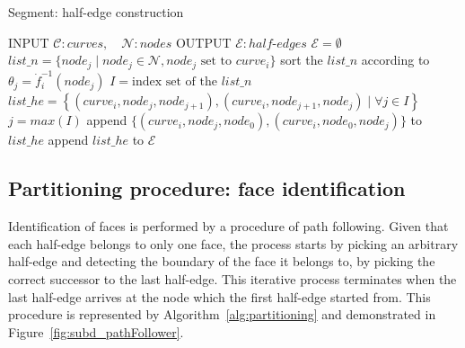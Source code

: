 \begin{algorithm}
  \caption {Segment: half-edge construction}
  \label{alg:halfedgeConstruction}
  \begin{algorithmic}
    \STATE INPUT  $\mathcal{C}:curves, \quad \mathcal{N}:nodes$
    \STATE OUTPUT  $\mathcal{E}:half\text{-}edges$
    \STATE \quad
    \STATE $\mathcal{E} = \emptyset$
    \STATE $list\_n = \{node_j \mid node_j \in \mathcal{N}, node_j \text{ set to } curve_i \}$
    \STATE sort the $list\_n$ according to $\theta_j=\dot{f}_{i}^{-1}(node_j)$
    \STATE $I= \text{index set of the } list\_n$
    \STATE $list\_he=\left\{(curve_i,node_j,node_{j+1}),(curve_i,node_{j+1},node_j) \mid \forall j \in I \right\}$
    \STATE $j=max(I)$
    \STATE append $\{(curve_i,node_j,node_{0}),(curve_i,node_0,node_{j})\}$ to $list\_he$
    \ENDIF
    \STATE append $list\_he$ to $\mathcal{E}$
    \ENDFOR    
  \end{algorithmic}
\end{algorithm}


\subsection{Partitioning procedure: face identification}
Identification of faces is performed by a procedure of path following.
Given that each half-edge belongs to only one face, the process starts by picking an arbitrary half-edge and detecting the boundary of the face it belongs to, by picking the correct successor to the last half-edge.
This iterative process terminates when the last half-edge arrives at the node which the first half-edge started from.
This procedure is represented by Algorithm~\ref{alg:partitioning} and demonstrated in Figure~\ref{fig:subd_pathFollower}.

